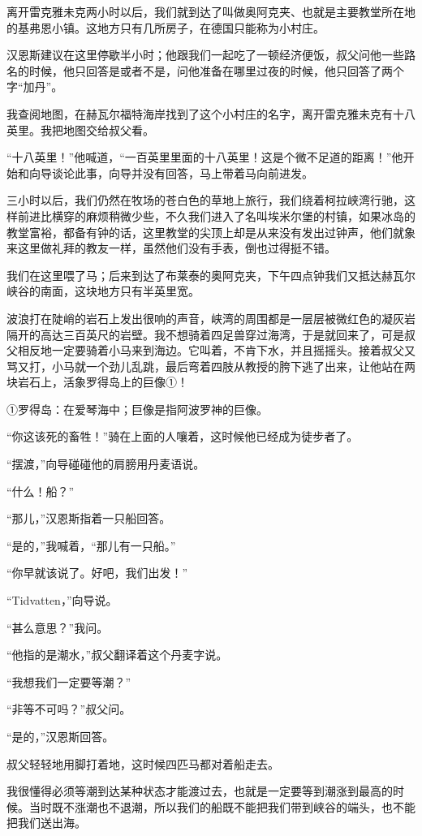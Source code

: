 \documentclass[10pt]{book}
\begin{document}
离开雷克雅未克两小时以后，我们就到达了叫做奥阿克夹、也就是主要教堂所在地的基弗恩小镇。这地方只有几所房子，在德国只能称为小村庄。

汉恩斯建议在这里停歇半小时；他跟我们一起吃了一顿经济便饭，叔父问他一些路名的时候，他只回答是或者不是，问他准备在哪里过夜的时候，他只回答了两个字“加丹”。

我查阅地图，在赫瓦尔福特海岸找到了这个小村庄的名字，离开雷克雅未克有十八英里。我把地图交给叔父看。

“十八英里！”他喊道，“一百英里里面的十八英里！这是个微不足道的距离！”他开始和向导谈论此事，向导并没有回答，马上带着马向前进发。

三小时以后，我们仍然在牧场的苍白色的草地上旅行，我们绕着柯拉峡湾行驰，这样前进比横穿的麻烦稍微少些，不久我们进入了名叫埃米尔堡的村镇，如果冰岛的教堂富裕，都备有钟的话，这里教堂的尖顶上却是从来没有发出过钟声，他们就象来这里做礼拜的教友一样，虽然他们没有手表，倒也过得挺不错。

我们在这里喂了马；后来到达了布莱泰的奥阿克夹，下午四点钟我们又抵达赫瓦尔峡谷的南面，这块地方只有半英里宽。

波浪打在陡峭的岩石上发出很响的声音，峡湾的周围都是一层层被微红色的凝灰岩隔开的高达三百英尺的岩壁。我不想骑着四足兽穿过海湾，于是就回来了，可是叔父相反地一定要骑着小马来到海边。它叫着，不肯下水，并且摇摇头。接着叔父又骂又打，小马就一个劲儿乱跳，最后弯着四肢从教授的胯下逃了出来，让他站在两块岩石上，活象罗得岛上的巨像①！

①罗得岛：在爱琴海中；巨像是指阿波罗神的巨像。

“你这该死的畜牲！”骑在上面的人嚷着，这时候他已经成为徒步者了。

“摆渡，”向导碰碰他的肩膀用丹麦语说。

“什么！船？”

“那儿，”汉恩斯指着一只船回答。

“是的，”我喊着，“那儿有一只船。”

“你早就该说了。好吧，我们出发！”

“Tidvatten，”向导说。

“甚么意思？”我问。

“他指的是潮水，”叔父翻译着这个丹麦字说。

“我想我们一定要等潮？”

“非等不可吗？”叔父问。

“是的，”汉恩斯回答。

叔父轻轻地用脚打着地，这时候四匹马都对着船走去。

我很懂得必须等潮到达某种状态才能渡过去，也就是一定要等到潮涨到最高的时候。当时既不涨潮也不退潮，所以我们的船既不能把我们带到峡谷的端头，也不能把我们送出海。
\end{document}

